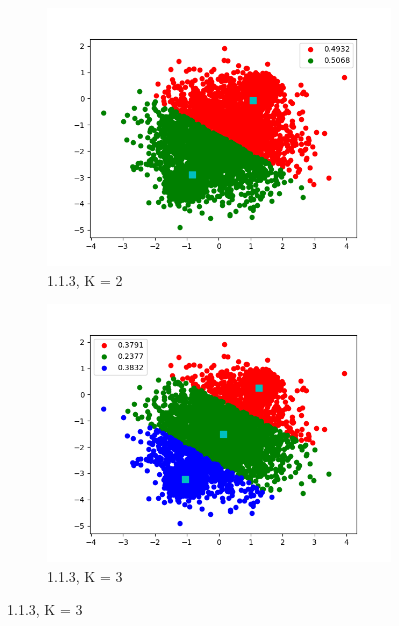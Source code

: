 \documentclass[12pt,letterpaper]{article}
\begin{document}
\begin{figure}
    \begin{subfigure}[b]{0.45\textwidth}
        \includegraphics[width=\textwidth]{imgs/kmeans_K_2.png}
        \caption{1.1.3, K = 2}
    \end{subfigure}
    \begin{subfigure}[b]{0.45\textwidth}
        \includegraphics[width=\textwidth]{imgs/kmeans_K_3.png}
        \caption{1.1.3, K = 3}
    \end{subfigure}
     

\end{figure}
\end{document}
